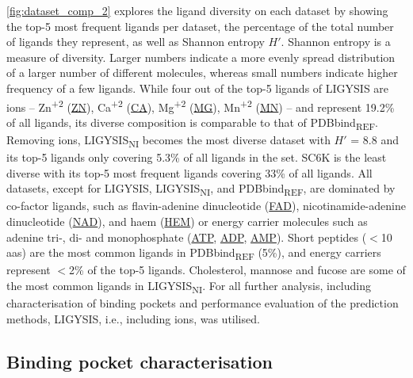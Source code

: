 \autoref{fig:dataset_comp_2} explores the ligand diversity on each dataset by showing the top-5 most frequent ligands per dataset, the percentage of the total number of ligands they represent, as well as Shannon entropy $H'$. Shannon entropy is a measure of diversity. Larger numbers indicate a more evenly spread distribution of a larger number of different molecules, whereas small numbers indicate higher frequency of a few ligands. While four out of the top-5 ligands of LIGYSIS are ions -- Zn\textsuperscript{+2} (\href{https://www.ebi.ac.uk/pdbe-srv/pdbechem/chemicalCompound/show/ZN}{ZN}), Ca\textsuperscript{+2} (\href{https://www.ebi.ac.uk/pdbe-srv/pdbechem/chemicalCompound/show/CA}{CA}), Mg\textsuperscript{+2} (\href{https://www.ebi.ac.uk/pdbe-srv/pdbechem/chemicalCompound/show/MG}{MG}), Mn\textsuperscript{+2} (\href{https://www.ebi.ac.uk/pdbe-srv/pdbechem/chemicalCompound/show/MN}{MN}) -- and represent 19.2\% of all ligands, its diverse composition is comparable to that of PDBbind\textsubscript{REF}. Removing ions, LIGYSIS\textsubscript{NI} becomes the most diverse dataset with $H'$ = 8.8 and its top-5 ligands only covering 5.3\% of all ligands in the set. SC6K is the least diverse with its top-5 most frequent ligands covering 33\% of all ligands. All datasets, except for LIGYSIS, LIGYSIS\textsubscript{NI}, and PDBbind\textsubscript{REF}, are dominated by co-factor ligands, such as flavin-adenine dinucleotide (\href{https://www.ebi.ac.uk/pdbe-srv/pdbechem/chemicalCompound/show/FAD}{FAD}), nicotinamide-adenine dinucleotide (\href{https://www.ebi.ac.uk/pdbe-srv/pdbechem/chemicalCompound/show/NAD}{NAD}), and haem (\href{https://www.ebi.ac.uk/pdbe-srv/pdbechem/chemicalCompound/show/HEM}{HEM}) or energy carrier molecules such as adenine tri-, di- and monophosphate (\href{https://www.ebi.ac.uk/pdbe-srv/pdbechem/chemicalCompound/show/ATP}{ATP}, \href{https://www.ebi.ac.uk/pdbe-srv/pdbechem/chemicalCompound/show/ADP}{ADP}, \href{https://www.ebi.ac.uk/pdbe-srv/pdbechem/chemicalCompound/show/AMP}{AMP}). Short peptides ($<$10 aas) are the most common ligands in PDBbind\textsubscript{REF} (5\%), and energy carriers represent $<$2\% of the top-5 ligands. Cholesterol, mannose and fucose are some of the most common ligands in LIGYSIS\textsubscript{NI}. For all further analysis, including characterisation of binding pockets and performance evaluation of the prediction methods, LIGYSIS, i.e., including ions, was utilised.

\subsection{Binding pocket characterisation}

